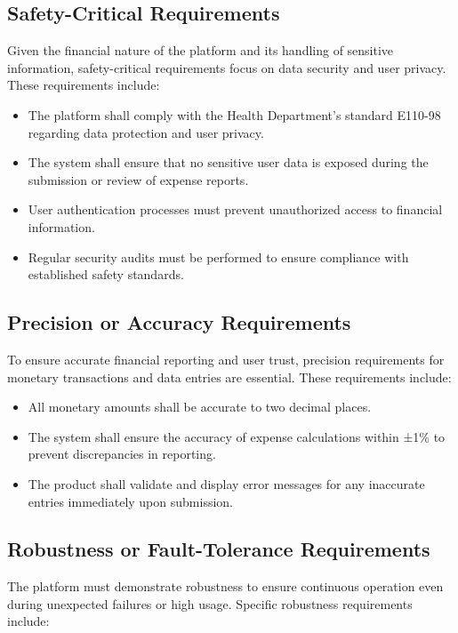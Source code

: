 \documentclass[12pt]{article}
\begin{document}
\subsection{Safety-Critical Requirements}
Given the financial nature of the platform and its handling of sensitive information, safety-critical requirements focus on data security and user privacy. These requirements include:

\begin{itemize}
    \item The platform shall comply with the Health Department’s standard E110-98 regarding data protection and user privacy.
    \item The system shall ensure that no sensitive user data is exposed during the submission or review of expense reports.
    \item User authentication processes must prevent unauthorized access to financial information.
    \item Regular security audits must be performed to ensure compliance with established safety standards.
\end{itemize}

\subsection{Precision or Accuracy Requirements}
To ensure accurate financial reporting and user trust, precision requirements for monetary transactions and data entries are essential. These requirements include:

\begin{itemize}
    \item All monetary amounts shall be accurate to two decimal places.
    \item The system shall ensure the accuracy of expense calculations within ±1\% to prevent discrepancies in reporting.
    \item The product shall validate and display error messages for any inaccurate entries immediately upon submission.
\end{itemize}

\subsection{Robustness or Fault-Tolerance Requirements}
The platform must demonstrate robustness to ensure continuous operation even during unexpected failures or high usage. Specific robustness requirements include:
\end{document}
